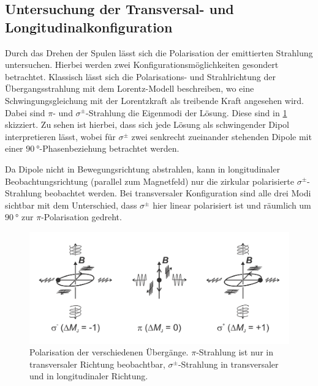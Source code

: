 \subsection{Untersuchung der Transversal- und Longitudinalkonfiguration}\label{sec:zeeman_quantitativ}
Durch das Drehen der Spulen lässt sich die Polarisation der emittierten Strahlung 
untersuchen. Hierbei werden zwei Konfigurationsmöglichkeiten gesondert betrachtet.
Klassisch lässt sich die Polarisations- und Strahlrichtung der Übergangsstrahlung 
mit dem Lorentz-Modell beschreiben, wo eine Schwingungsgleichung mit der Lorentzkraft als 
treibende Kraft angesehen wird. Dabei sind $\pi$- und $\sigma^\pm$-Strahlung die Eigenmodi 
der Lösung. Diese sind in \cref{fig:zeeman_polarisation} skizziert. Zu sehen ist hierbei, 
dass sich jede Lösung als schwingender Dipol interpretieren lässt, wobei für $\sigma^\pm$ 
zwei senkrecht zueinander stehenden Dipole mit einer $\SI{90}{\degree}$-Phasenbeziehung 
betrachtet werden.

Da Dipole nicht in Bewegungsrichtung abstrahlen, kann in longitudinaler 
Beobachtungsrichtung (parallel zum Magnetfeld) nur die zirkular polarisierte $\sigma^\pm$-Strahlung
beobachtet werden. Bei transversaler Konfiguration sind alle drei Modi sichtbar mit dem 
Unterschied, dass $\sigma^\pm$ hier linear polarisiert ist und räumlich um $\SI{90}{\degree}$
zur $\pi$-Polarisation gedreht.

\begin{figure}[h]
    \centering
    \includegraphics[width=0.6\linewidth]{../figs/zeeman_polarisation}
    \caption{Polarisation der verschiedenen Übergänge. $\pi$-Strahlung ist nur in transversaler 
    Richtung beobachtbar, $\sigma^\pm$-Strahlung in transversaler und in longitudinaler 
    Richtung. \cite{zeeman_handblatt}}
    \label{fig:zeeman_polarisation}
\end{figure}

